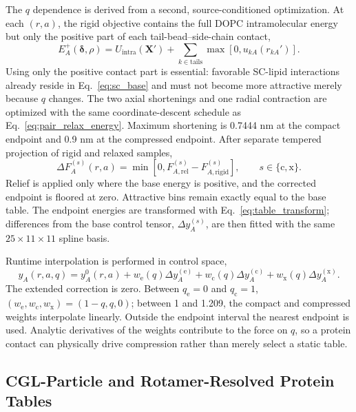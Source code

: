 \documentclass{article}
\begin{document}
The $q$ dependence is derived from a second, source-conditioned optimization.
At each $(r,a)$, the rigid objective contains the full DOPC intramolecular
energy but only the positive part of each tail-bead--side-chain contact,
\begin{equation}
E_A^+(\boldsymbol\delta,\rho)=U_{\mathrm{intra}}(\mathbf X')
+\sum_{k\in\mathrm{tails}}\max[0,u_{kA}(r_{kA}')].
\label{eq:sc_relax_energy}
\end{equation}
Using only the positive contact part is essential: favorable SC-lipid
interactions already reside in Eq.~\ref{eq:sc_base} and must not become more
attractive merely because $q$ changes.  The two axial shortenings and one
radial contraction are optimized with the same coordinate-descent schedule as
Eq.~\ref{eq:pair_relax_energy}.  Maximum shortening is 0.7444 nm at the compact
endpoint and 0.9 nm at the compressed endpoint.  After separate tempered
projection of rigid and relaxed samples,
\begin{equation}
\Delta F_A^{(s)}(r,a)=
\min[0,F_{A,\mathrm{rel}}^{(s)}-F_{A,\mathrm{rigid}}^{(s)}],
\qquad s\in\{\mathrm c,\mathrm x\}.
\label{eq:sc_relax}
\end{equation}
Relief is applied only where the base energy is positive, and the corrected
endpoint is floored at zero.  Attractive bins remain exactly equal to the
base table.  The endpoint energies are transformed with
Eq.~\ref{eq:table_transform}; differences from the base control tensor,
$\Delta y_A^{(s)}$, are then fitted with the same $25\times11\times11$ spline
basis.

Runtime interpolation is performed in control space,
\begin{equation}
y_A(r,a,q)=y_A^0(r,a)+w_{\mathrm e}(q)\Delta y_A^{(\mathrm e)}
+w_{\mathrm c}(q)\Delta y_A^{(\mathrm c)}
+w_{\mathrm x}(q)\Delta y_A^{(\mathrm x)}.
\label{eq:sc_mix}
\end{equation}
The extended correction is zero.  Between $q_{\mathrm e}=0$ and
$q_{\mathrm c}=1$, $(w_{\mathrm e},w_{\mathrm c},w_{\mathrm x})=(1-q,q,0)$;
between 1 and 1.209, the compact and compressed weights interpolate linearly.
Outside the endpoint interval the nearest endpoint is used.  Analytic
derivatives of the weights contribute to the force on $q$, so a protein
contact can physically drive compression rather than merely select a static
table.

\subsection{CGL-Particle and Rotamer-Resolved Protein Tables}
\end{document}
